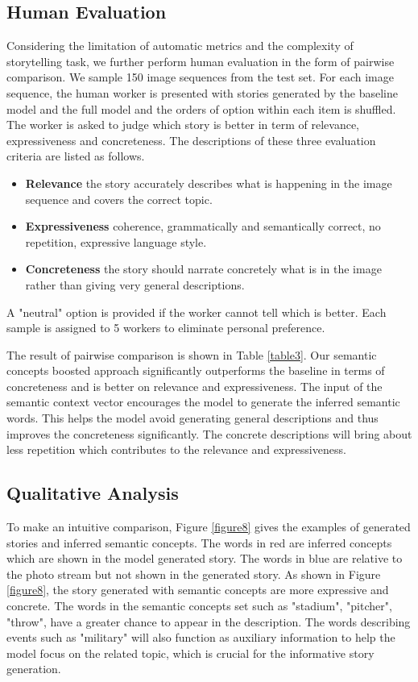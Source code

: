 \documentclass[sigconf]{acmart}
\begin{document}
\subsection{Human Evaluation}
Considering the limitation of automatic metrics and the complexity of storytelling task, we further perform human evaluation in the form of pairwise comparison. We sample 150 image sequences from the test set. For each image sequence, the human worker is presented with stories generated by the baseline model and the full model and the orders of option within each item is shuffled. The worker is asked to judge which story is better in term of relevance, expressiveness and concreteness. The descriptions of these three evaluation criteria are listed as follows.
\begin{itemize}
    \item \textbf{Relevance} the story accurately describes what is happening in the image sequence and covers the correct topic.
    \item \textbf{Expressiveness} coherence, grammatically and semantically correct, no repetition, expressive language style.
    \item \textbf{Concreteness} the story should narrate concretely what is in the image rather than giving very general descriptions.
\end{itemize}

A "neutral" option is provided if the worker cannot tell which is better. Each sample is assigned to 5 workers to eliminate personal preference.

The result of pairwise comparison is shown in Table \ref{table3}. Our semantic concepts boosted approach significantly outperforms the baseline in terms of concreteness and is better on relevance and expressiveness. The input of the semantic context vector encourages the model to generate the inferred semantic words. This helps the model avoid generating general descriptions and thus improves the concreteness significantly. The concrete descriptions will bring about less repetition which contributes to the relevance and expressiveness.

\subsection{Qualitative Analysis}
To make an intuitive comparison, Figure \ref{figure8} gives the examples of generated stories and inferred semantic concepts. The words in red are inferred concepts which are shown in the model generated story. The words in blue are relative to the photo stream but not shown in the generated story. As shown in Figure \ref{figure8}, the story generated with semantic concepts are more expressive and concrete. The words in the semantic concepts set such as "stadium", "pitcher", "throw", have a greater chance to appear in the description. The words describing events such as "military" will also function as auxiliary information to help the model focus on the related topic, which is crucial for the informative story generation.
\end{document}
